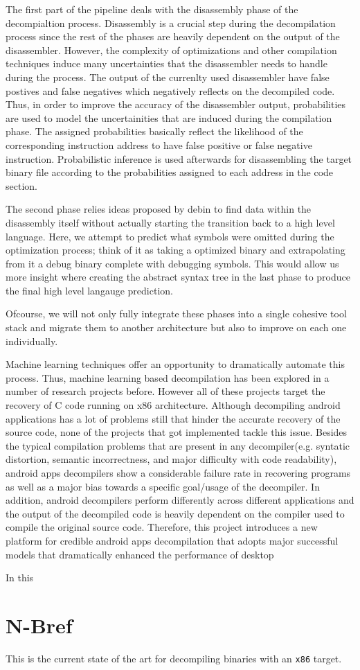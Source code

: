 \documentclass{article}
\begin{document}
The first part of the pipeline deals with the disassembly phase of the decompialtion process. Disassembly is a crucial step during the decompilation process since the rest of the phases are heavily dependent on the output of the disassembler. However, the complexity of optimizations and other compilation techniques induce many uncertainties that the disassembler needs to handle during the process. The output of the currenlty used disassembler have false postives and false negatives which negatively reflects on the decompiled code. Thus, in order to improve the accuracy of the disassembler output, probabilities are used to model the uncertainities that are induced during the compilation phase. The assigned probabilities basically reflect the likelihood of the corresponding instruction address to have false positive or false negative instruction. Probabilistic inference is used afterwards for disassembling the target binary file according to the probabilities assigned to each address in the code section. 


The second phase relies ideas proposed by debin to find data within the disassembly itself without actually starting the transition back to a high level language.
Here, we attempt to predict what symbols were omitted during the optimization process; think of it as taking a optimized binary and extrapolating from it a debug binary complete with debugging symbols.
This would allow us more insight where creating the abstract syntax tree in the last phase to produce the final high level langauge prediction.

Ofcourse, we will not only fully integrate these phases into a single cohesive tool stack and migrate them to another architecture but also to improve on each one individually.

\noindent Machine learning techniques offer an opportunity to dramatically automate this process. Thus, machine learning based decompilation has been explored in a number of research projects before. 
However all of these projects target the recovery of C code running on x86 architecture. Although decompiling android applications has a lot of problems still that hinder the accurate recovery of the source code, none of the projects that got implemented tackle this issue.
Besides the typical compilation problems that are present in any decompiler(e.g. syntatic distortion, semantic incorrectness, and major difficulty with code readability), android apps decompilers show a considerable failure rate in recovering programs as well as a major bias towards a specific goal/usage of the decompiler. In addition, android decompilers perform differently across different applications and the output of the decompiled code is heavily dependent on the compiler used to compile the original source code.
Therefore, this project introduces a new platform for credible android apps decompilation that adopts major successful models that dramatically enhanced the performance of desktop  

In this 

\section{N-Bref}

This is the current state of the art for decompiling binaries with an \verb|x86| target.
\end{document}
